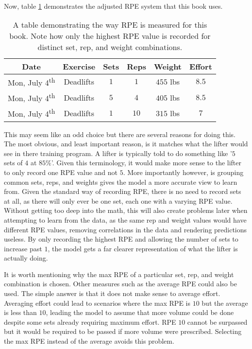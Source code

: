Now, table \ref{tab:NonStandardRPEExample} demonstrates the adjusted RPE system that this book uses.

\begin{table}[h]
	\centering
	\begin{tabular}{c|c|c|c|c|c}
		Date & Exercise & Sets & Reps & Weight & Effort \\
        \hline
        Mon, July 4\textsuperscript{th} & Deadlifts & $1$ & $1$ & $455$ lbs & $8.5$ \\
        Mon, July 4\textsuperscript{th} & Deadlifts & $5$ & $4$ & $405$ lbs & $8.5$ \\
        Mon, July 4\textsuperscript{th} & Deadlifts & $1$ & $10$ & $315$ lbs & $7$ \\
	\end{tabular}
	\caption{A table demonstrating the way RPE is measured for this book. Note how only the highest RPE value is recorded for distinct set, rep, and weight combinations.}
	\label{tab:NonStandardRPEExample}
\end{table}

This may seem like an odd choice but there are several reasons for doing this. The most obvious, and least important reason, is it matches what the lifter would see in there training program. A lifter is typically told to do something like '$5$ sets of $4$ at $85$\%'. Given this terminology, it would make more sense to the lifter to only record one RPE value and not $5$. More importantly however, is grouping common sets, reps, and weights gives the model a more accurate view to learn from. Given the standard way of recording RPE, there is no need to record sets at all, as there will only ever be one set, each one with a varying RPE value. Without getting too deep into the math, this will also create problems later when attempting to learn from the data, as the same rep and weight values would have different RPE values, removing correlations in the data and rendering predictions useless. By only recording the highest RPE and allowing the number of sets to increase past $1$, the model gets a far clearer representation of what the lifter is actually doing.

It is worth mentioning why the max RPE of a particular set, rep, and weight combination is chosen. Other measures such as the average RPE could also be used. The simple answer is that it does not make sense to average effort. Averaging effort could lead to scenarios where the max RPE is $10$ but the average is less than $10$, leading the model to assume that more volume could be done despite some sets already requiring maximum effort. RPE $10$ cannot be surpassed but it would be required to be passed if more volume were prescribed. Selecting the max RPE instead of the average avoids this problem.

